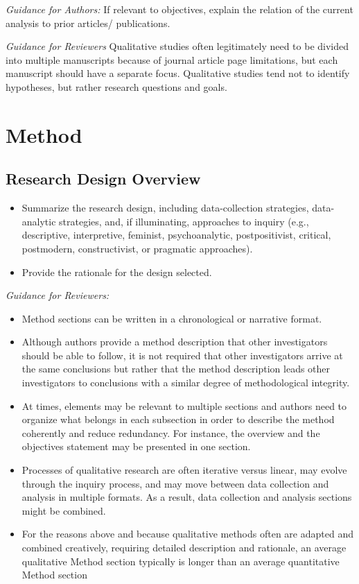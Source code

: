 \documentclass[acmsmall]{acmart}
\begin{document}
\textit{Guidance for Authors:} If relevant to objectives, explain the relation of the current analysis to prior articles/ publications.
\vspace{3mm}

\textit{Guidance for Reviewers} Qualitative studies often legitimately need to be divided into multiple manuscripts because of journal article page limitations, but each manuscript should have a separate focus. Qualitative studies tend not to identify hypotheses, but rather research questions and goals.

\section{Method}

\subsection{Research Design Overview}

\begin{itemize}
    \item Summarize the research design, including data-collection strategies, data-analytic
strategies, and, if illuminating, approaches to inquiry (e.g., descriptive, interpretive, feminist,
psychoanalytic, postpositivist, critical, postmodern, constructivist, or pragmatic approaches).
\item Provide the rationale for the design selected.
\end{itemize}

\textit{Guidance for Reviewers:}

\begin{itemize}
    \item Method sections can be written in a chronological or narrative format.
    \item Although authors provide a method description that other investigators should be able to follow, it is not required that other investigators arrive at the same conclusions but rather that the method description leads other investigators to conclusions with a similar degree of methodological integrity.
\item At times, elements may be relevant to multiple sections and authors need to organize what belongs in each subsection in order to describe the method coherently and reduce redundancy. For instance, the overview and the objectives statement may be presented
in one section.
\item Processes of qualitative research are often iterative versus linear, may evolve through the
inquiry process, and may move between data collection and analysis in multiple formats. As a result, data collection and analysis sections might be combined.
\item For the reasons above and because qualitative methods often are adapted and
combined creatively, requiring detailed description and rationale, an average qualitative
Method section typically is longer than an average quantitative Method section
\end{itemize}
\end{document}
